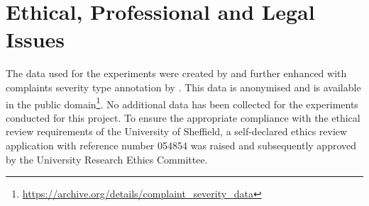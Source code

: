\section{Ethical, Professional and Legal Issues}
The data used for the experiments were created by \cite{preotiuc-pietro_automatically_2019} and further enhanced with complaints severity type annotation by \cite{jinModelingSeverityComplaints2021}. This data is anonymised and is available in the public domain\footnote{\url{ https://archive.org/details/complaint_severity_data}}. No additional data has been collected for the experiments conducted for this project. To ensure the appropriate compliance with the ethical review requirements of the University of Sheffield, a self-declared ethics review application with reference number 054854 was raised and subsequently approved by the University Research Ethics Committee.
